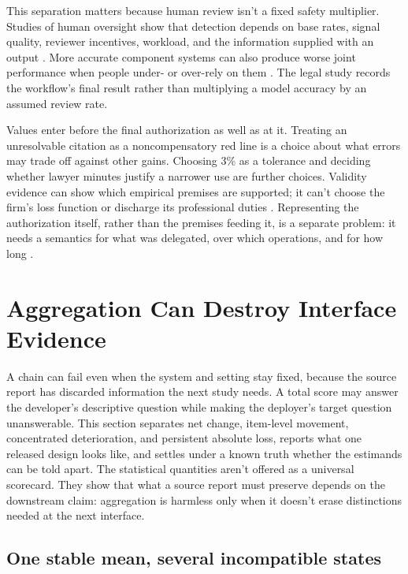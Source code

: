 \documentclass[12pt]{article}
\begin{document}
This separation matters because human review isn't a fixed safety multiplier. Studies of human oversight show that detection depends on base rates, signal quality, reviewer incentives, workload, and the information supplied with an output \citep{langer2025oversight}. More accurate component systems can also produce worse joint performance when people under- or over-rely on them \citep{buijsman2026accuracy}. The legal study records the workflow's final result rather than multiplying a model accuracy by an assumed review rate.

Values enter before the final authorization as well as at it. Treating an unresolvable citation as a noncompensatory red line is a choice about what errors may trade off against other gains. Choosing 3\% as a tolerance and deciding whether lawyer minutes justify a narrower use are further choices. Validity evidence can show which empirical premises are supported; it can't choose the firm's loss function or discharge its professional duties \citep[747--749]{messick1995Validity}. Representing the authorization itself, rather than the premises feeding it, is a separate problem: it needs a semantics for what was delegated, over which operations, and for how long \citep{anonSelfDelegationAssurance}.

\section{Aggregation Can Destroy Interface Evidence}\label{sec:aggregation}

A chain can fail even when the system and setting stay fixed, because the source report has discarded information the next study needs. A total score may answer the developer's descriptive question while making the deployer's target question unanswerable. This section separates net change, item-level movement, concentrated deterioration, and persistent absolute loss, reports what one released design looks like, and settles under a known truth whether the estimands can be told apart. The statistical quantities aren't offered as a universal scorecard. They show that what a source report must preserve depends on the downstream claim: aggregation is harmless only when it doesn't erase distinctions needed at the next interface.

\subsection{One stable mean, several incompatible states}\label{ssec:aggregate_logic}
\end{document}
